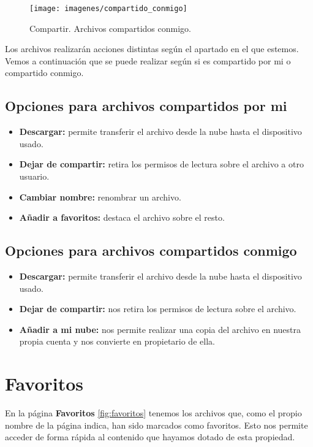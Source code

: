 \begin{figure}[H]
	\centering
	\texttt{[image: imagenes/compartido\_conmigo]}
	\caption{Compartir. Archivos compartidos conmigo.}
	\label{fig:compartido_conmigo}
\end{figure}

Los archivos realizarán acciones distintas según el apartado en el que estemos. Vemos a continuación que se puede realizar según si es compartido por mi o compartido conmigo.

\subsection{Opciones para archivos compartidos por mi}
\begin{itemize}
	\item \textbf{Descargar:} permite transferir el archivo desde la nube hasta el dispositivo usado.
	\item \textbf{Dejar de compartir:} retira los permisos de lectura sobre el archivo a otro usuario.
	\item \textbf{Cambiar nombre:} renombrar un archivo.
	\item \textbf{Añadir a favoritos:} destaca el archivo sobre el resto.
\end{itemize} 

\subsection{Opciones para archivos compartidos conmigo}
\begin{itemize}
	\item \textbf{Descargar:} permite transferir el archivo desde la nube hasta el dispositivo usado.
	\item \textbf{Dejar de compartir:} nos retira los permisos de lectura sobre el archivo.
	\item \textbf{Añadir a mi nube:} nos permite realizar una copia del archivo en nuestra propia cuenta y nos convierte en propietario de ella.
\end{itemize}

\section{Favoritos}
En la página \textbf{Favoritos} \ref{fig:favoritos} tenemos los archivos que, como el propio nombre de la página indica, han sido marcados como favoritos. Esto nos permite acceder de forma rápida al contenido que hayamos dotado de esta propiedad.

